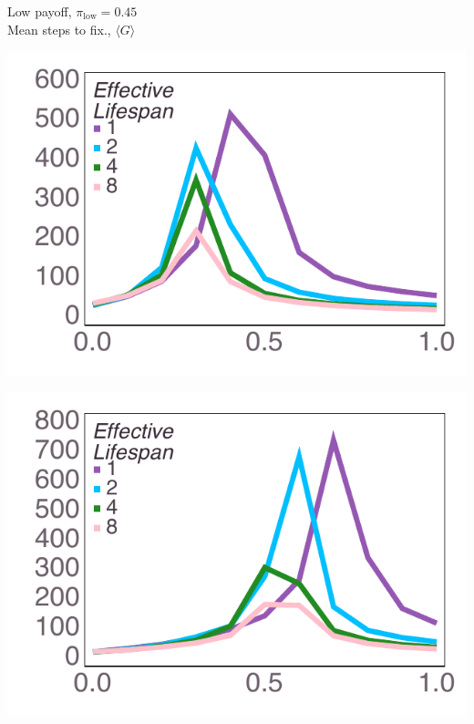 \documentclass[varwidth=true,crop=false]{standalone}
\newcommand{\pisub}[1]{\pi_{\mathrm{#1}}}
\newcommand{\pilow}{\pisub{low}}
\newcommand{\meanvar}[1]{\langle #1 \rangle}
\newcommand{\meanG}{\meanvar{G}}
\begin{document}
    \begin{minipage}{3.75in}
    \begin{rotate}{90}
      {\parbox{3.0in}{
          \centering
          \vspace{-1.0em}\hspace{-2.5em} {\huge Low payoff, $\pilow = 0.45$} \\[1em]
          {\huge Mean steps to fix., $\meanG$}
      }}
    \end{rotate}%
    \hspace{2em}
      \includegraphics[width=\textwidth]{Figures/step_over_u_lowpayoff=0.45_nbehaviors=2.pdf}
	\end{minipage}\noindent\hspace{1.25em}
	\begin{minipage}{3.75in}%
      \includegraphics[width=\textwidth]{Figures/step_over_u_lowpayoff=0.45_nbehaviors=4.pdf}
    \end{minipage}\noindent
\end{document}
